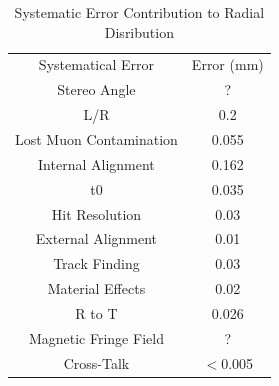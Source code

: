 \documentclass[./Thesis]{subfiles}
\begin{document}
\begin{table}%
\begin{center}
\caption{Systematic Error Contribution to Radial Disribution}
\label{Tab:RadialErrors}
\begin{tabular}{ c c }
\hline
Systematical Error		&   Error (mm)\\
Stereo Angle			&    ? \\
L/R					&    0.2\\
Lost Muon Contamination &	0.055 \\
Internal Alignment		&	0.162\\
t$0$					&	0.035 \\
Hit Resolution			&	0.03\\
External Alignment		&	0.01\\
Track Finding			&	0.03 \\
Material Effects			&	0.02\\
R to T				& 	0.026 \\
Magnetic Fringe Field	&	? \\
Cross-Talk			&	$<$0.005 \\
\hline
\end{tabular}
\end{center}
\end{table}

		
		
	
\end{document}
